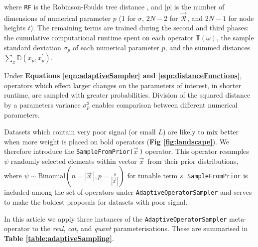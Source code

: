 \documentclass[10pt,letterpaper]{article}
\begin{document}
where \texttt{RF} is the Robinson-Foulds tree distance \cite{robinson1981comparison}, and $|p|$ is the number of dimensions of numerical parameter $p$ (1 for $\sigma$, $2N-2$ for $\vec{\mathcal{R}}^{\,}$, and $2N-1$ for node heights $t$).
The remaining terms are trained during the second and third phases: the cumulative computational runtime spent on each operator $\mathbb{T}(\omega)$, the sample standard deviation $\sigma_p$ of each numerical parameter $p$, and the summed distances $\sum_x \mathbb{D}(x_p, x_p^\prime)$.








Under \textbf{Equations \ref{eqn:adaptiveSampler} and \ref{eqn:distanceFunctions}}, operators which effect larger changes on the parameters of interest, in shorter runtime, are sampled with greater probabilities. 
Division of the squared distance by a parameters variance $\sigma^2_p$ enables comparison between different numerical parameters.


Datasets which contain very poor signal (or small $L$) are likely to mix better when more weight is placed on bold operators (\textbf{Fig \ref{fig:landscape}}). 
We therefore introduce the \texttt{SampleFromPrior($\vec{x}^{\,}$)} operator.
This operator resamples $\psi$ randomly selected elements within vector $\vec{x}^{\,}$ from their prior distributions, where $\psi \sim \text{Binomial}(n=|\vec{x}^{\,}|, p=\frac{s}{|\vec{x}^{\,}|})$ for tunable term $s$.
\texttt{SampleFromPrior} is included among the set of operators under \texttt{AdaptiveOperatorSampler} and serves to make the boldest proposals for datasets with poor signal.
 






In this article we apply three instances of the \texttt{AdaptiveOperatorSampler} meta-operator to the \textit{real}, \textit{cat}, and \textit{quant} parameterisations. 
These are summarised in \textbf{Table \ref{table:adaptiveSampling}}.
\end{document}
